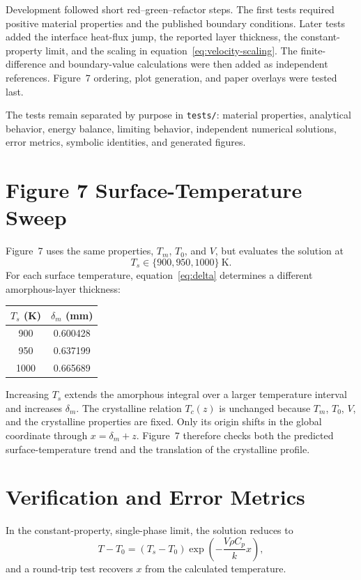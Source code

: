 \documentclass[11pt]{article}
\begin{document}
Development followed short red--green--refactor steps. The first tests required
positive material properties and the published boundary conditions. Later
tests added the interface heat-flux jump, the reported layer thickness, the
constant-property limit, and the scaling in equation~\eqref{eq:velocity-scaling}.
The finite-difference and boundary-value calculations were then added as
independent references. Figure~7 ordering, plot generation, and paper overlays
were tested last.

The tests remain separated by purpose in \texttt{tests/}: material properties,
analytical behavior, energy balance, limiting behavior, independent numerical
solutions, error metrics, symbolic identities, and generated figures.

\section{Figure 7 Surface-Temperature Sweep}
Figure~7 uses the same properties, $T_m$, $T_0$, and $V$, but evaluates the
solution at
\begin{equation}
 T_s\in\{900,950,1000\}\ \mathrm{K}.
\end{equation}
For each surface temperature, equation~\eqref{eq:delta} determines a different
amorphous-layer thickness:
\begin{center}
\begin{tabular}{c|c}
$T_s$ (K) & $\delta_m$ (mm) \\
\hline
900  & 0.600428 \\
950  & 0.637199 \\
1000 & 0.665689
\end{tabular}
\end{center}
Increasing $T_s$ extends the amorphous integral over a larger temperature
interval and increases $\delta_m$. The crystalline relation $T_c(z)$ is
unchanged because $T_m$, $T_0$, $V$, and the crystalline properties are fixed.
Only its origin shifts in the global coordinate through
$x=\delta_m+z$. Figure~7 therefore checks both the predicted surface-temperature
trend and the translation of the crystalline profile.

\section{Verification and Error Metrics}
In the constant-property, single-phase limit, the solution reduces to
\begin{equation}
 T-T_0=(T_s-T_0)\exp\left(-\frac{V\rho C_p}{k}x\right),
 \label{eq:constant-limit}
\end{equation}
and a round-trip test recovers $x$ from the calculated temperature.
\end{document}
